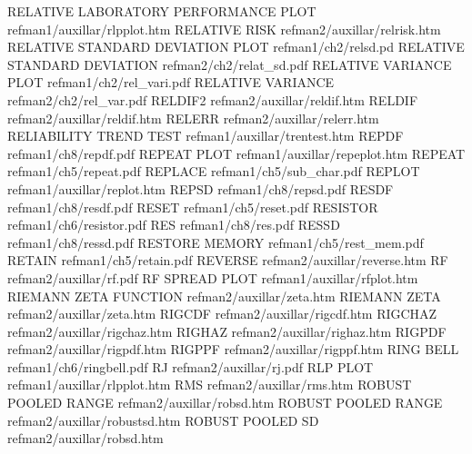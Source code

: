 RELATIVE LABORATORY PERFORMANCE PLOT    refman1/auxillar/rlpplot.htm
RELATIVE RISK                           refman2/auxillar/relrisk.htm
RELATIVE STANDARD DEVIATION PLOT        refman1/ch2/relsd.pd
RELATIVE STANDARD DEVIATION             refman2/ch2/relat_sd.pdf
RELATIVE VARIANCE PLOT                  refman1/ch2/rel_vari.pdf
RELATIVE VARIANCE                       refman2/ch2/rel_var.pdf
RELDIF2                                 refman2/auxillar/reldif.htm
RELDIF                                  refman2/auxillar/reldif.htm
RELERR                                  refman2/auxillar/relerr.htm
RELIABILITY TREND TEST                  refman1/auxillar/trentest.htm
REPDF                                   refman1/ch8/repdf.pdf
REPEAT PLOT                             refman1/auxillar/repeplot.htm
REPEAT                                  refman1/ch5/repeat.pdf
REPLACE                                 refman1/ch5/sub_char.pdf
REPLOT                                  refman1/auxillar/replot.htm
REPSD                                   refman1/ch8/repsd.pdf
RESDF                                   refman1/ch8/resdf.pdf
RESET                                   refman1/ch5/reset.pdf
RESISTOR                                refman1/ch6/resistor.pdf
RES                                     refman1/ch8/res.pdf
RESSD                                   refman1/ch8/ressd.pdf
RESTORE MEMORY                          refman1/ch5/rest_mem.pdf
RETAIN                                  refman1/ch5/retain.pdf
REVERSE                                 refman2/auxillar/reverse.htm
RF                                      refman2/auxillar/rf.pdf
RF SPREAD PLOT                          refman1/auxillar/rfplot.htm
RIEMANN ZETA FUNCTION                   refman2/auxillar/zeta.htm
RIEMANN ZETA                            refman2/auxillar/zeta.htm
RIGCDF                                  refman2/auxillar/rigcdf.htm
RIGCHAZ                                 refman2/auxillar/rigchaz.htm
RIGHAZ                                  refman2/auxillar/righaz.htm
RIGPDF                                  refman2/auxillar/rigpdf.htm
RIGPPF                                  refman2/auxillar/rigppf.htm
RING BELL                               refman1/ch6/ringbell.pdf
RJ                                      refman2/auxillar/rj.pdf
RLP PLOT                                refman1/auxillar/rlpplot.htm
RMS                                     refman2/auxillar/rms.htm
ROBUST POOLED RANGE                     refman2/auxillar/robsd.htm
ROBUST POOLED RANGE                     refman2/auxillar/robustsd.htm
ROBUST POOLED SD                        refman2/auxillar/robsd.htm
